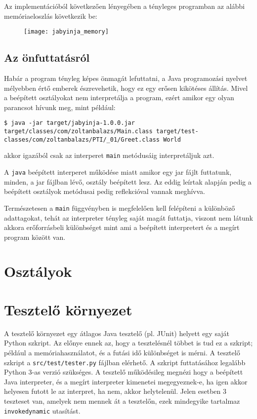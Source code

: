 Az implementációból következően lényegében a tényleges programban az alábbi memóriaeloszlás következik be:

\begin{figure}[H]
	\centering
	\texttt{[image: jabyinja\_memory]}
\end{figure}

\subsection{Az önfuttatásról}

Habár a program tényleg képes önmagát lefuttatni, a Java programozási nyelvet mélyebben értő emberek észrevehetik, hogy ez egy erősen kikötéses állítás. Mivel a beépített osztályokat nem interpretálja a program, ezért amikor egy olyan parancsot hívunk meg, mint például: 
\begin{verbatim}
$ java -jar target/jabyinja-1.0.0.jar target/classes/com/zoltanbalazs/Main.class target/test-classes/com/zoltanbalazs/PTI/_01/Greet.class World
\end{verbatim}
akkor igazából csak az interperet \lstinline{main} metódusáig interpretáljuk azt.

A \lstinline{java} beépített interperet működése miatt amikor egy jar fájlt futtatunk, minden, a jar fájlban lévő, osztály beépített lesz. Az eddig leírtak alapján pedig a beépített osztályok metódusai pedig reflekcióval vannak meghívva.

Természetesen a \lstinline{main} függvényben is megfelelően kell felépíteni a különböző adattagokat, tehát az interpreter tényleg saját magát futtatja, viszont nem látunk akkora erőforrásbeli különbséget mint ami a beépített interpretert és a megírt program között van.

\section{Osztályok}

\section{Tesztelő környezet}

A tesztelő környezet egy átlagos Java tesztelő (pl. JUnit) helyett egy saját Python szkript. Az előnye ennek az, hogy a tesztelésnél többet is tud ez a szkript; például a memóriahasználatot, és a futási idő különbséget is mérni. A tesztelő szkript a \lstinline{src/test/tester.py} fájlban elérhető. A szkript futtatásához legalább Python 3-as verzió szükséges. A tesztelő működésileg megnézi hogy a beépített Java interpreter, és a megírt interpreter kimenetei megegyeznek-e, ha igen akkor helyesen futott le az interpret, ha nem, akkor helytelenül. Jelen esetben 3 teszteset van, amelyek nem mennek át a tesztelőn, ezek mindegyike tartalmaz \lstinline{invokedynamic} utasítást.

